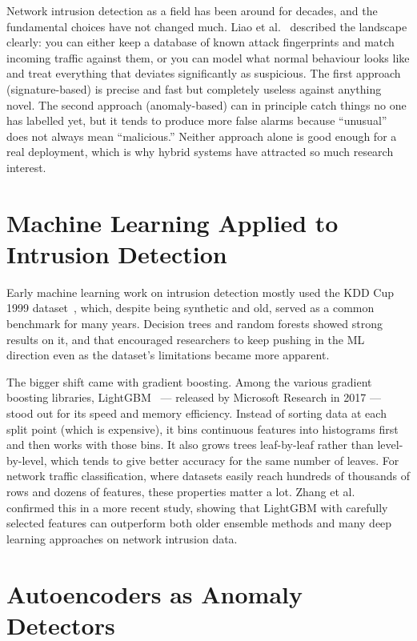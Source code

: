 \documentclass[12pt,a4paper]{report}
\begin{document}
\noindent Network intrusion detection as a field has been around for decades, and the
fundamental choices have not changed much. Liao et al.~\cite{nids_survey} described
the landscape clearly: you can either keep a database of known attack fingerprints
and match incoming traffic against them, or you can model what normal behaviour looks
like and treat everything that deviates significantly as suspicious. The first approach
(signature-based) is precise and fast but completely useless against anything novel.
The second approach (anomaly-based) can in principle catch things no one has labelled
yet, but it tends to produce more false alarms because ``unusual'' does not always mean
``malicious.'' Neither approach alone is good enough for a real deployment, which is
why hybrid systems have attracted so much research interest.

\section{Machine Learning Applied to Intrusion Detection}

Early machine learning work on intrusion detection mostly used the KDD Cup 1999
dataset~\cite{kdd_cup}, which, despite being synthetic and old, served as a common
benchmark for many years. Decision trees and random forests showed strong results on
it, and that encouraged researchers to keep pushing in the ML direction even as the
dataset's limitations became more apparent.

\noindent The bigger shift came with gradient boosting. Among the various gradient
boosting libraries, LightGBM~\cite{lightgbm_paper} — released by Microsoft Research in
2017 — stood out for its speed and memory efficiency. Instead of sorting data at each
split point (which is expensive), it bins continuous features into histograms first and
then works with those bins. It also grows trees leaf-by-leaf rather than level-by-level,
which tends to give better accuracy for the same number of leaves. For network traffic
classification, where datasets easily reach hundreds of thousands of rows and dozens of
features, these properties matter a lot. Zhang et al.~\cite{lgbm_ids} confirmed this
in a more recent study, showing that LightGBM with carefully selected features can
outperform both older ensemble methods and many deep learning approaches on network
intrusion data.

\section{Autoencoders as Anomaly Detectors}
\end{document}
